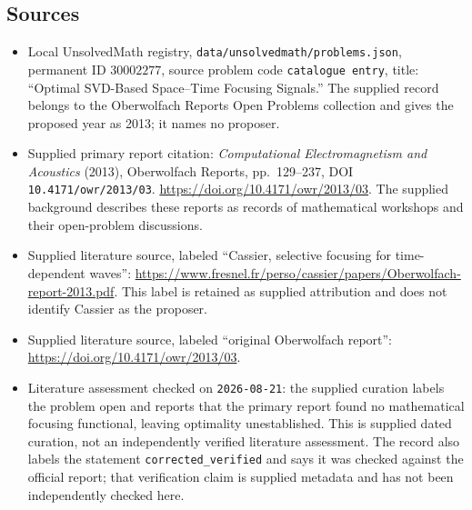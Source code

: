 \documentclass[11pt]{article}
\begin{document}
\subsection{Sources}
\begin{itemize}
\item Local UnsolvedMath registry, \texttt{data/unsolvedmath/problems.json}, permanent ID \(30002277\), source problem code \texttt{catalogue entry}, title: ``Optimal SVD-Based Space--Time Focusing Signals.'' The supplied record belongs to the Oberwolfach Reports Open Problems collection and gives the proposed year as 2013; it names no proposer.
\item Supplied primary report citation: \emph{Computational Electromagnetism and Acoustics} (2013), Oberwolfach Reports, pp.\ 129--237, DOI \texttt{10.4171/owr/2013/03}. \url{https://doi.org/10.4171/owr/2013/03}. The supplied background describes these reports as records of mathematical workshops and their open-problem discussions.
\item Supplied literature source, labeled ``Cassier, selective focusing for time-dependent waves'': \url{https://www.fresnel.fr/perso/cassier/papers/Oberwolfach-report-2013.pdf}. This label is retained as supplied attribution and does not identify Cassier as the proposer.
\item Supplied literature source, labeled ``original Oberwolfach report'': \url{https://doi.org/10.4171/owr/2013/03}.
\item Literature assessment checked on \texttt{2026-08-21}: the supplied curation labels the problem open and reports that the primary report found no mathematical focusing functional, leaving optimality unestablished. This is supplied dated curation, not an independently verified literature assessment. The record also labels the statement \texttt{corrected\_verified} and says it was checked against the official report; that verification claim is supplied metadata and has not been independently checked here.
\end{itemize}
\end{document}
